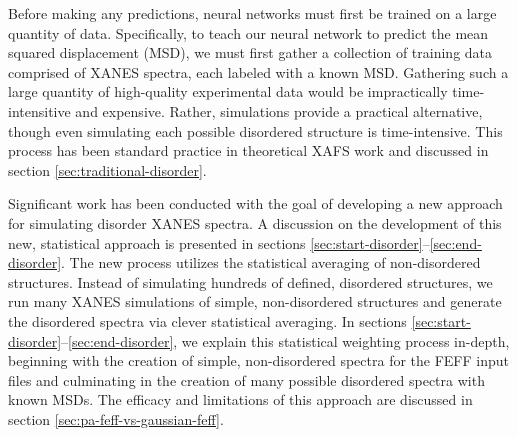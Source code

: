 
Before making any predictions, neural networks must first be trained on a large quantity of data. Specifically, to teach our neural network to predict the mean squared displacement (MSD), we must first gather a collection of training data comprised of XANES spectra, each labeled with a known MSD. Gathering such a large quantity of high-quality experimental data would be impractically time-intensitive and expensive. Rather, simulations provide a practical alternative, though even simulating each possible disordered structure is time-intensive. This process has been standard practice in theoretical XAFS work and discussed in section \ref{sec:traditional-disorder}. 

Significant work has been conducted with the goal of developing a new approach for simulating disorder XANES spectra. A discussion on the development of this new, statistical approach is presented in sections \ref{sec:start-disorder}--\ref{sec:end-disorder}. The new process utilizes the statistical averaging of non-disordered structures. Instead of simulating hundreds of defined, disordered structures, we run many XANES simulations of simple, non-disordered structures and generate the disordered spectra via clever statistical averaging. In sections \ref{sec:start-disorder}--\ref{sec:end-disorder}, we explain this statistical weighting process in-depth, beginning with the creation of simple, non-disordered spectra for the FEFF input files and culminating in the creation of many possible disordered spectra with known MSDs. The efficacy and limitations of this approach are discussed in section \ref{sec:pa-feff-vs-gaussian-feff}.

